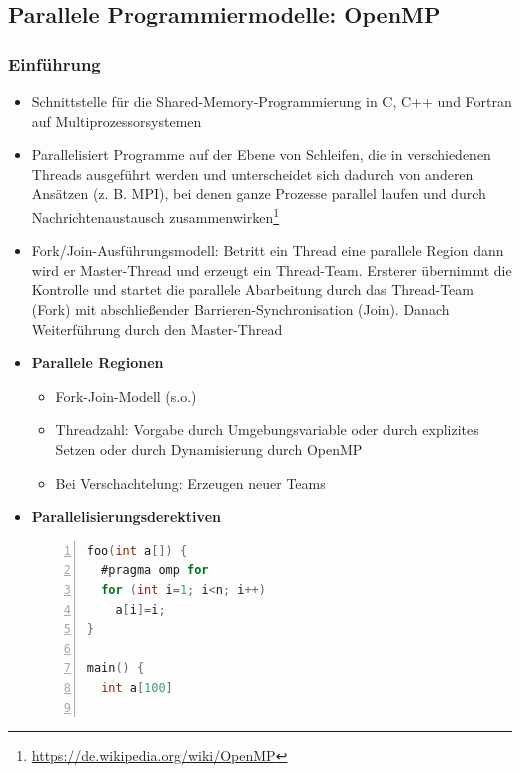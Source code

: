 \subsection{Parallele Programmiermodelle: OpenMP}

\subsubsection{Einführung}
\begin{itemize}
	\item Schnittstelle für die Shared-Memory-Programmierung in C, C++ und Fortran auf Multiprozessorsystemen
	\item Parallelisiert Programme auf der Ebene von Schleifen, die in verschiedenen Threads ausgeführt werden und unterscheidet sich dadurch von anderen Ansätzen (z. B. MPI), bei denen ganze Prozesse parallel laufen und durch Nachrichtenaustausch zusammenwirken\footnote{\url{https://de.wikipedia.org/wiki/OpenMP}}
	\item Fork/Join-Ausführungsmodell: Betritt ein Thread eine parallele Region dann wird er Master-Thread und erzeugt ein Thread-Team. Ersterer  übernimmt die Kontrolle und startet die parallele Abarbeitung durch das Thread-Team (Fork) mit abschließender Barrieren-Synchronisation (Join). Danach Weiterführung durch den Master-Thread
	\item \textbf{Parallele Regionen}
	\begin{itemize}
		\item Fork-Join-Modell (s.o.)
		\item Threadzahl: Vorgabe durch Umgebungsvariable oder durch explizites Setzen oder durch Dynamisierung durch OpenMP
		\item Bei Verschachtelung: Erzeugen neuer Teams
	\end{itemize}
	\item \textbf{Parallelisierungsderektiven}
	\begin{lstlisting}[frame=single,numbers=left,mathescape,language=C]
foo(int a[]) {
  #pragma omp for
  for (int i=1; i<n; i++)
    a[i]=i;
}

main() {
  int a[100]


\end{lstlisting}
\end{itemize}
